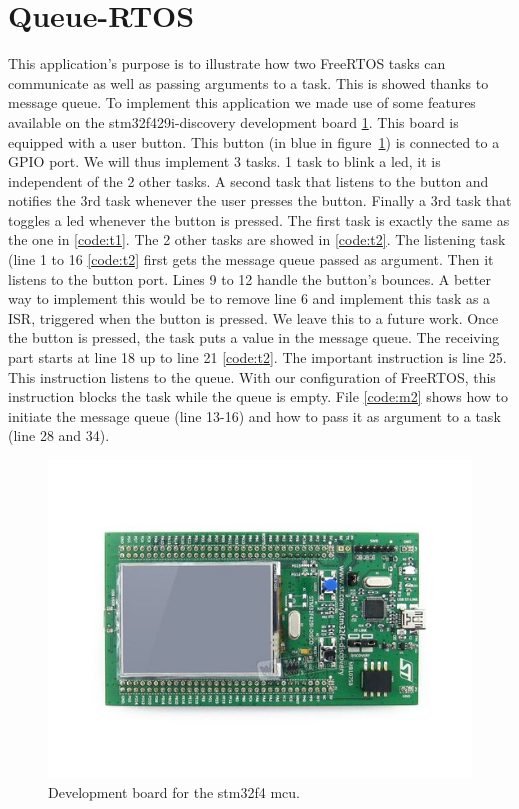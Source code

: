 \documentclass[12pt,a4paper]{report}
\begin{document}
\section{Queue-RTOS}
\label{sec:qr}
This application's purpose is to illustrate how two FreeRTOS tasks can communicate as well as passing arguments to a task. This is showed thanks to message queue. To implement this application we made use of some features available on the stm32f429i-discovery development board \ref{fig:board}. This board is equipped with a user button. This button (in blue in figure~\ref{fig:board}) is connected to a GPIO port. We will thus implement 3 tasks. 1 task to blink a led, it is independent of the 2 other tasks. A second task that listens to the button and notifies the 3rd task whenever the user presses the button. Finally a 3rd task that toggles a led whenever the button is pressed.\newline
The first task is exactly the same as the one in \ref{code:t1}. The 2 other tasks are showed in \ref{code:t2}. The listening task (line 1 to 16 \ref{code:t2} first gets the message queue passed as argument. Then it listens to the button port. Lines 9 to 12 handle the button's bounces. A better way to implement this would be to remove line 6 and implement this task as a ISR, triggered when the button is pressed. We leave this to a future work. Once the button is pressed, the task puts a value in the message queue. The receiving part starts at line 18 up to line 21 \ref{code:t2}. The important instruction is line 25. This instruction listens to the queue. With our configuration of FreeRTOS, this instruction blocks the task while the queue is empty.\newline
File \ref{code:m2} shows how to initiate the message queue (line 13-16) and how to pass it as argument to a task (line 28 and 34). 
\begin{figure}[h]
    \centering
    \includegraphics[scale=0.5]{figs/board.jpg}
    \caption{Development board for the stm32f4 mcu.}
    \label{fig:board}
\end{figure}


\end{document}
